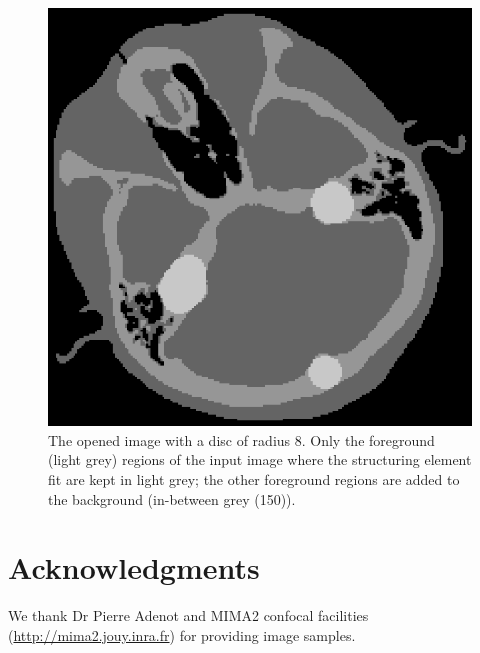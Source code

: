 \documentclass{InsightArticle}
\begin{document}
\begin{figure}
\centering
\includegraphics{open.eps}
\caption{The opened image with a disc of radius 8. Only the foreground (light
grey) regions of the input image where the structuring element fit are kept in
light grey; the other foreground regions are added to the background (in-between
grey (150)).\label{open}}
\end{figure}

\section{Acknowledgments}
We thank Dr Pierre Adenot and MIMA2 confocal facilities (\url{http://mima2.jouy.inra.fr})
for providing image samples.




\nocite{ITKSoftwareGuide}
\end{document}
